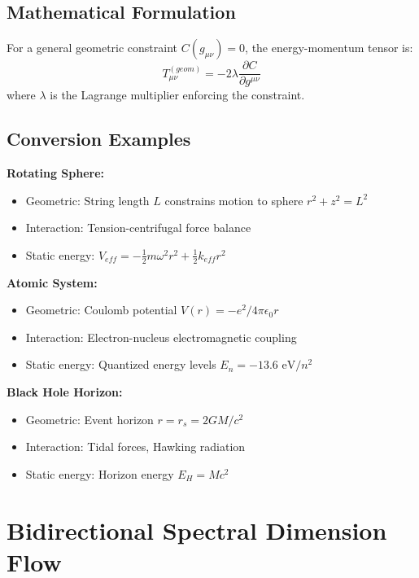 \documentclass[12pt,a4paper]{article}
\begin{document}
\subsection{Mathematical Formulation}

For a general geometric constraint $C(g_{\mu\nu}) = 0$, the energy-momentum tensor is:
\begin{equation}
    T_{\mu\nu}^{(geom)} = -2\lambda \frac{\partial C}{\partial g^{\mu\nu}}
\end{equation}
where $\lambda$ is the Lagrange multiplier enforcing the constraint.

\subsection{Conversion Examples}

\textbf{Rotating Sphere:}
\begin{itemize}
    \item Geometric: String length $L$ constrains motion to sphere $r^2 + z^2 = L^2$
    \item Interaction: Tension-centrifugal force balance
    \item Static energy: $V_{eff} = -\frac{1}{2}m\omega^2 r^2 + \frac{1}{2}k_{eff}r^2$
\end{itemize}

\textbf{Atomic System:}
\begin{itemize}
    \item Geometric: Coulomb potential $V(r) = -e^2/4\pi\epsilon_0 r$
    \item Interaction: Electron-nucleus electromagnetic coupling
    \item Static energy: Quantized energy levels $E_n = -13.6 \text{ eV}/n^2$
\end{itemize}

\textbf{Black Hole Horizon:}
\begin{itemize}
    \item Geometric: Event horizon $r = r_s = 2GM/c^2$
    \item Interaction: Tidal forces, Hawking radiation
    \item Static energy: Horizon energy $E_H = Mc^2$
\end{itemize}

\section{Bidirectional Spectral Dimension Flow}
\label{app:bidirectional}
\end{document}
